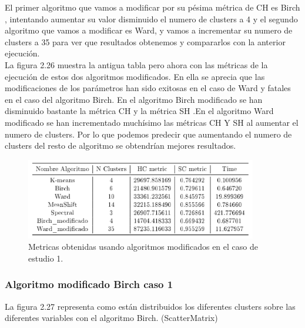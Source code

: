 	El primer algoritmo que vamos a modificar por su pésima métrica de CH es Birch , intentando 
	aumentar su valor disminuido el numero de clusters a 4 y el segundo algoritmo que vamos a modificar es Ward, y vamos a incrementar su numero de clusters a 35
	para ver que resultados obtenemos y compararlos con la anterior ejecución. \\

	La figura 2.26 muestra la antigua tabla pero ahora con las métricas de la ejecución de estos dos algoritmos modificados.
	En ella se aprecia que las modificaciones de los parámetros han sido exitosas en el caso de Ward
	y fatales en el caso del algoritmo Birch. En el algoritmo Birch modificado se han disminuido bastante la métrica CH y la métrica SH 
	.En el algoritmo Ward modificado se han incrementado muchísimo las métricas
	CH Y SH al aumentar el numero de clusters. Por lo que podemos predecir que aumentando el numero de clusters del resto de
	algoritmo se obtendrían mejores resultados. 

	\begin{figure}[htb]
		\centering
		\includegraphics[width=0.9\textwidth]{./imagenes/caso1/algoritmos_modificados_caso1}
		\caption{Metricas obtenidas usando algoritmos modificados en el caso de estudio 1.} \label{fig:1}
	\end{figure}

	\subsubsection{Algoritmo modificado Birch caso 1}

	La figura 2.27 representa como están distribuidos los diferentes clusters sobre las diferentes variables con el 
	algoritmo Birch. (ScatterMatrix)\\

